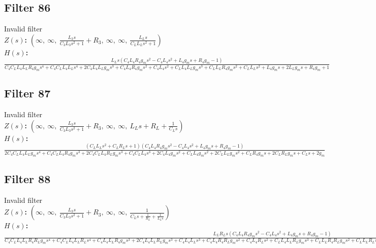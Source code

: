 \documentclass{article}
\begin{document}
\subsection*{Filter 86}
Invalid filter \\ 
\textbf{$Z(s)$:} $\left( \infty, \  \infty, \  \frac{L_{3} s}{C_{3} L_{3} s^{2} + 1} + R_{3}, \  \infty, \  \infty, \  \frac{L_{L} s}{C_{L} L_{L} s^{2} + 1}\right)$ \\ 
\textbf{$H(s)$:} $\frac{L_{L} s \left(C_{4} L_{4} R_{4} g_{m} s^{2} - C_{4} L_{4} s^{2} + L_{4} g_{m} s + R_{4} g_{m} - 1\right)}{C_{4} C_{L} L_{4} L_{L} R_{4} g_{m} s^{4} + C_{4} C_{L} L_{4} L_{L} s^{4} + 2 C_{4} L_{4} L_{L} g_{m} s^{3} + C_{4} L_{4} R_{4} g_{m} s^{2} + C_{4} L_{4} s^{2} + C_{L} L_{4} L_{L} g_{m} s^{3} + C_{L} L_{L} R_{4} g_{m} s^{2} + C_{L} L_{L} s^{2} + L_{4} g_{m} s + 2 L_{L} g_{m} s + R_{4} g_{m} + 1}$ \\ 
\subsection*{Filter 87}
Invalid filter \\ 
\textbf{$Z(s)$:} $\left( \infty, \  \infty, \  \frac{L_{3} s}{C_{3} L_{3} s^{2} + 1} + R_{3}, \  \infty, \  \infty, \  L_{L} s + R_{L} + \frac{1}{C_{L} s}\right)$ \\ 
\textbf{$H(s)$:} $\frac{\left(C_{L} L_{L} s^{2} + C_{L} R_{L} s + 1\right) \left(C_{4} L_{4} R_{4} g_{m} s^{2} - C_{4} L_{4} s^{2} + L_{4} g_{m} s + R_{4} g_{m} - 1\right)}{2 C_{4} C_{L} L_{4} L_{L} g_{m} s^{4} + C_{4} C_{L} L_{4} R_{4} g_{m} s^{3} + 2 C_{4} C_{L} L_{4} R_{L} g_{m} s^{3} + C_{4} C_{L} L_{4} s^{3} + 2 C_{4} L_{4} g_{m} s^{2} + C_{L} L_{4} g_{m} s^{2} + 2 C_{L} L_{L} g_{m} s^{2} + C_{L} R_{4} g_{m} s + 2 C_{L} R_{L} g_{m} s + C_{L} s + 2 g_{m}}$ \\ 
\subsection*{Filter 88}
Invalid filter \\ 
\textbf{$Z(s)$:} $\left( \infty, \  \infty, \  \frac{L_{3} s}{C_{3} L_{3} s^{2} + 1} + R_{3}, \  \infty, \  \infty, \  \frac{1}{C_{L} s + \frac{1}{R_{L}} + \frac{1}{L_{L} s}}\right)$ \\ 
\textbf{$H(s)$:} $\frac{L_{L} R_{L} s \left(C_{4} L_{4} R_{4} g_{m} s^{2} - C_{4} L_{4} s^{2} + L_{4} g_{m} s + R_{4} g_{m} - 1\right)}{C_{4} C_{L} L_{4} L_{L} R_{4} R_{L} g_{m} s^{4} + C_{4} C_{L} L_{4} L_{L} R_{L} s^{4} + C_{4} L_{4} L_{L} R_{4} g_{m} s^{3} + 2 C_{4} L_{4} L_{L} R_{L} g_{m} s^{3} + C_{4} L_{4} L_{L} s^{3} + C_{4} L_{4} R_{4} R_{L} g_{m} s^{2} + C_{4} L_{4} R_{L} s^{2} + C_{L} L_{4} L_{L} R_{L} g_{m} s^{3} + C_{L} L_{L} R_{4} R_{L} g_{m} s^{2} + C_{L} L_{L} R_{L} s^{2} + L_{4} L_{L} g_{m} s^{2} + L_{4} R_{L} g_{m} s + L_{L} R_{4} g_{m} s + 2 L_{L} R_{L} g_{m} s + L_{L} s + R_{4} R_{L} g_{m} + R_{L}}$ \\ 
\end{document}
